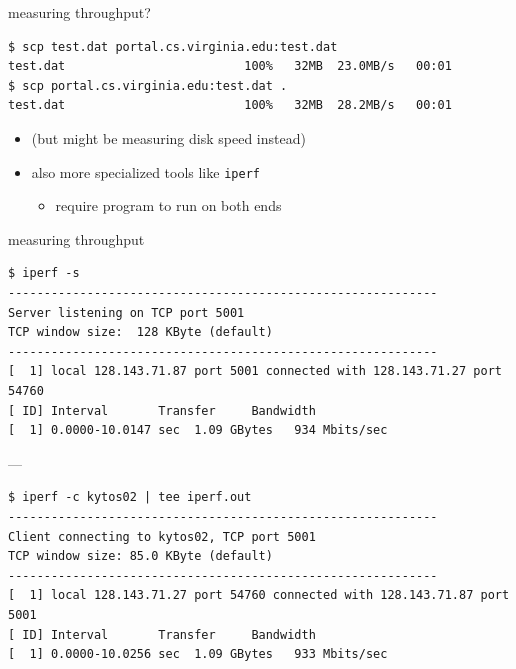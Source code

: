 \begin{frame}[fragile]{measuring throughput?}
\begin{Verbatim}[fontsize=\fontsize{10}{11}]
$ scp test.dat portal.cs.virginia.edu:test.dat
test.dat                         100%   32MB  23.0MB/s   00:01    
$ scp portal.cs.virginia.edu:test.dat .
test.dat                         100%   32MB  28.2MB/s   00:01   
\end{Verbatim}
\begin{itemize}
\item (but might be measuring disk speed instead)
\vspace{.5cm}
\item also more specialized tools like \texttt{iperf}
    \begin{itemize}
    \item require program to run on both ends
    \end{itemize}
\end{itemize}
\end{frame}

\begin{frame}[fragile]{measuring throughput}
\begin{Verbatim}[fontsize=\fontsize{10}{11}]
$ iperf -s
------------------------------------------------------------
Server listening on TCP port 5001
TCP window size:  128 KByte (default)
------------------------------------------------------------
[  1] local 128.143.71.87 port 5001 connected with 128.143.71.27 port 54760
[ ID] Interval       Transfer     Bandwidth
[  1] 0.0000-10.0147 sec  1.09 GBytes   934 Mbits/sec
\end{Verbatim}
---
\begin{Verbatim}[fontsize=\fontsize{10}{11}]
$ iperf -c kytos02 | tee iperf.out
------------------------------------------------------------
Client connecting to kytos02, TCP port 5001
TCP window size: 85.0 KByte (default)
------------------------------------------------------------
[  1] local 128.143.71.27 port 54760 connected with 128.143.71.87 port 5001
[ ID] Interval       Transfer     Bandwidth
[  1] 0.0000-10.0256 sec  1.09 GBytes   933 Mbits/sec
\end{Verbatim}
\end{frame}


